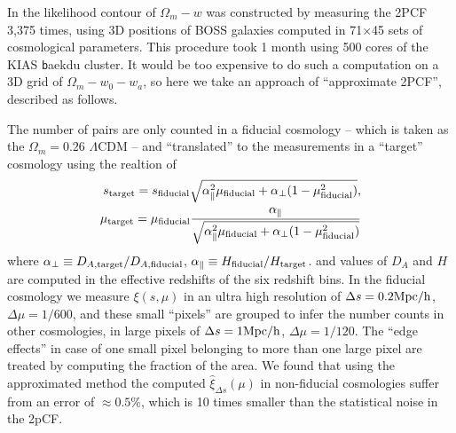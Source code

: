 \documentclass[prl,twocolumn,superscriptaddress,aps,amsmath,amssymb,nofootinbib,altaffilletter]{revtex4}
\begin{document}
In \cite{Li2016} the likelihood contour of $\Omega_m-w$ was constructed by
measuring the 2PCF 3,375 times,
using 3D positions of BOSS galaxies computed in 71$\times$45 sets of cosmological parameters.
This procedure took 1 month using 500 cores of the KIAS {\texttt baekdu} cluster.
It would be too expensive to do such a computation on a 3D grid of $\Omega_m-w_0-w_a$,
so here we take an approach  of ``approximate 2PCF'', described as follows.

The number of pairs are only counted in a fiducial cosmology
-- which is taken as the $\Omega_m=0.26$ $\Lambda$CDM --
and ``translated'' to the measurements in a ``target'' cosmology using the realtion of 
\begin{eqnarray}
 s_{\rm target} = s_{\rm fiducial} \sqrt{\alpha_{\parallel}^2 \mu_{\rm fiducial}+\alpha_{\bot}(1-\mu_{\rm fiducial}^2)}, \\
 \mu_{\rm target} = \mu_{\rm fiducial} \frac{\alpha_\parallel}
 {\sqrt{\alpha_{\parallel}^2 \mu_{\rm fiducial} +\alpha_{\bot}(1-\mu_{\rm fiducial}^2)}}
\end{eqnarray}
where $\alpha_{\bot}\equiv D_{A,\rm target}/D_{A,\rm fiducial}$,
$\alpha_{\parallel}\equiv H_{\rm fiducial}/H_{\rm target}$.
and values of $D_A$ and $H$ are computed in the effective redshifts of the six redshift bins.
In the fiducial cosmology
we measure $\xi(s,\mu)$ in an ultra high resolution of
$\Delta s = 0.2 {\rm Mpc/h}$, $\Delta \mu = 1/600$,
and these small ``pixels'' are grouped to infer 
the number counts in other cosmologies, 
in large pixels of $\Delta s = 1 {\rm Mpc/h}$, $\Delta \mu = 1/120$.
The ``edge effects'' in case of one small pixel belonging to more than one large pixel
are treated by computing the fraction of the area.
We found that using the approximated method the computed 
$\hat\xi_{\Delta s}(\mu)$ in non-fiducial cosmologies suffer from
an error of $\approx0.5\%$, which is 10 times smaller than 
the statistical noise in the 2pCF.
\end{document}
